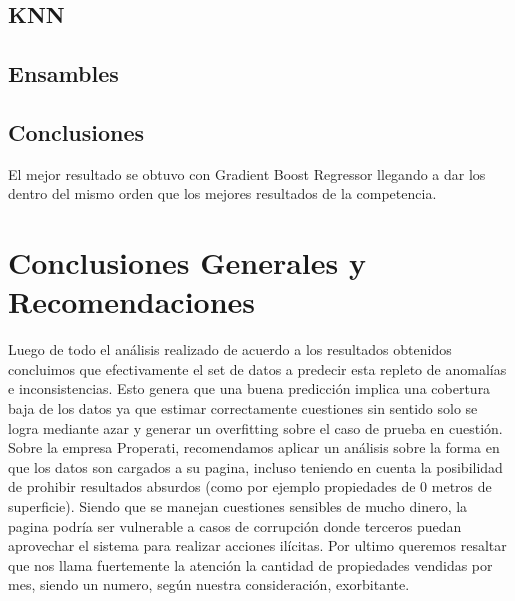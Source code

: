 \documentclass[a4paper, 10pt]{article}
\begin{document}
		\subsection{KNN}
		\subsection{Ensambles}		
		
		\subsection{Conclusiones}
			El mejor resultado se obtuvo con Gradient Boost Regressor llegando a dar los dentro del mismo orden que los mejores resultados de la competencia.
			
		\section{Conclusiones Generales y Recomendaciones}
		
			Luego de todo el análisis realizado de acuerdo a los resultados obtenidos concluimos que efectivamente el set de datos a predecir esta repleto de anomalías e inconsistencias. Esto genera que una buena predicción implica una cobertura baja de los datos ya que estimar correctamente cuestiones sin sentido solo se logra mediante azar y generar un overfitting sobre el caso de prueba en cuestión.\\
			Sobre la empresa Properati, recomendamos aplicar un análisis sobre la forma en que los datos son cargados a su pagina, incluso teniendo en cuenta la posibilidad de prohibir resultados absurdos (como por ejemplo propiedades de 0 metros de superficie). Siendo que se manejan cuestiones sensibles de mucho dinero, la pagina podría ser vulnerable a casos de corrupción donde terceros puedan aprovechar el sistema para realizar acciones ilícitas. Por ultimo queremos resaltar que nos llama fuertemente la atención la cantidad de propiedades vendidas por mes, siendo un numero, según nuestra consideración, exorbitante.	
			
\end{document}
